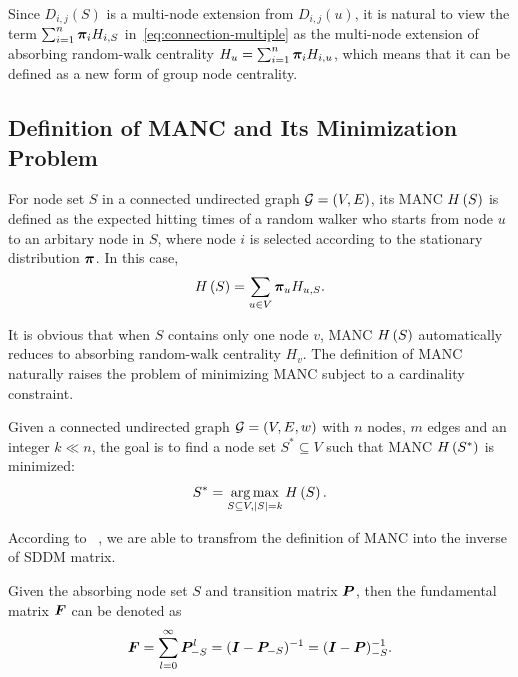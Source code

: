 \documentclass[sigconf]{acmart}
\begin{document}
Since \(D_{i,j}(S)\) is a multi-node extension from \(D_{i,j}(u)\), it is natural to view the term \(\sum_{i=1}^n\boldsymbol{\pi}_iH_{i,S}\) in~\eqref{eq:connection-multiple} as the multi-node extension of absorbing random-walk centrality \(H_u=\sum_{i=1}^n\boldsymbol{\pi}_iH_{i,u}\), which means that it can be defined as a new form of group node centrality.

\subsection{Definition of MANC and Its Minimization Problem}\label{subsec:def-manc}


\begin{definition}\label{def:manc}
    For node set \(S\) in a connected undirected graph \(\mathcal{G}=(V,E)\), its MANC \(H\left(S\right)\) is defined as the expected hitting times of a random walker who starts from node \(u\) to an arbitary node in \(S\), where node \(i\) is selected according to the stationary distribution \(\boldsymbol{\pi}\).
    In this case,
    \[H\left(S\right)=\sum_{u\in V}\boldsymbol{\pi}_u H_{u,S}.\]
\end{definition}

It is obvious that when \(S\) contains only one node \(v\), MANC \(H\left(S\right)\) automatically reduces to absorbing random-walk centrality \(H_v\).
The definition of MANC naturally raises the problem of minimizing MANC subject to a cardinality constraint.

\begin{problem}
Given a connected undirected graph \(\mathcal{G}=(V,E,w)\) with \(n\) nodes, \(m\) edges and an integer \(k\ll n\), the goal is to find a node set \(S^*\subseteq V\) such that MANC \(H\left(S^*\right)\) is minimized:
\[S^*=\operatorname*{arg\,max}_{S\subseteq V,\left|S \right|=k}H\left(S\right).\]
\end{problem}

According to ~\cite{KeSn76}, we are able to transfrom the definition of MANC into the inverse of SDDM matrix.

\begin{fact}
    Given the absorbing node set \(S\) and transition matrix \(\boldsymbol{P}\), then the fundamental matrix \(\boldsymbol{F}\) can be denoted as
    \begin{equation}\label{eq:funda}
        \boldsymbol{F}=\sum_{l=0}^\infty\boldsymbol{P}_{-S}^l=(\boldsymbol{I}-\boldsymbol{P}_{-S})^{-1}=(\boldsymbol{I}-\boldsymbol{P})_{-S}^{-1}.
    \end{equation}
\end{fact}
\end{document}
